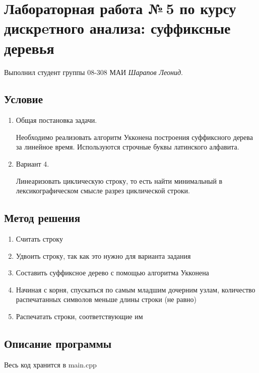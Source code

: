\documentclass[12pt]{article}
\begin{document}
\section*{Лабораторная работа №\,5 по курсу дискрeтного анализа: суффиксные деревья}

Выполнил студент группы 08-308 МАИ \textit{Шарапов Леонид}.

\subsection*{Условие}

\begin{enumerate}
\item Общая постановка задачи.

Необходимо реализовать алгоритм Укконена построения суффиксного дерева за линейное время. Используются строчные буквы латинского алфавита.

\item Вариант 4. 

Линеаризовать циклическую строку, то есть найти минимальный в лексикографическом смысле разрез циклической строки.

\end{enumerate}

\subsection*{Метод решения}

\begin{enumerate}
\item Считать строку
\item Удвоить строку, так как это нужно для варианта задания
\item Составить суффиксное дерево с помощью алгоритма Укконена
\item Начиная с корня, спускаться по самым младшим дочерним узлам, количество распечатанных символов меньше длины строки (не равно)
\item Распечатать строки, соответствующие им
\end{enumerate}

\subsection*{Описание программы}

Весь код хранится в main.cpp
\end{document}
